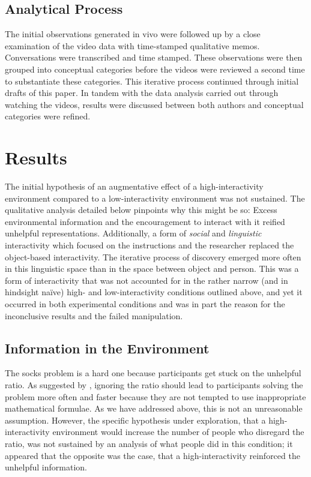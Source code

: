 {{
\subsection{Analytical Process}

The initial observations generated in vivo were followed up by a close examination of the video data with time-stamped qualitative memos.
Conversations were transcribed and time stamped. These observations were then grouped into conceptual categories before the videos were reviewed a second time to substantiate these categories. This iterative process continued through initial drafts of this paper. In tandem with the data analysis carried out through watching the videos, results were discussed between both authors and conceptual categories were refined.


\section{Results}

The initial hypothesis of an augmentative effect of a high-interactivity environment compared to a low-interactivity environment was not sustained. The qualitative analysis detailed below pinpoints why this might be so: Excess environmental information and the encouragement to interact with it reified unhelpful representations. Additionally, a form of \emph{social} and \emph{linguistic} interactivity which focused on the instructions and the researcher replaced the object-based interactivity. The iterative process of discovery emerged more often in this linguistic space than in the space between object and person. This was a form of interactivity that was not accounted for in the rather narrow (and in hindsight naïve) high- and low-interactivity conditions outlined above, and yet it occurred in both experimental conditions and was in part the reason for the inconclusive results and the failed manipulation.


\subsection{Information in the Environment}

The socks problem is a hard one because participants get stuck on the unhelpful ratio. As suggested by \textcite{Vallée-Tourangeau2020}, ignoring the ratio should lead to participants solving the problem more often and faster because they are not tempted to use inappropriate mathematical formulae. As we have addressed above, this is not an unreasonable assumption. However, the specific hypothesis under exploration, that a high-interactivity environment would increase the number of people who disregard the ratio, was not sustained by an analysis of what people did in this condition; it appeared that the opposite was the case, that a high-interactivity reinforced the unhelpful information.

}}
